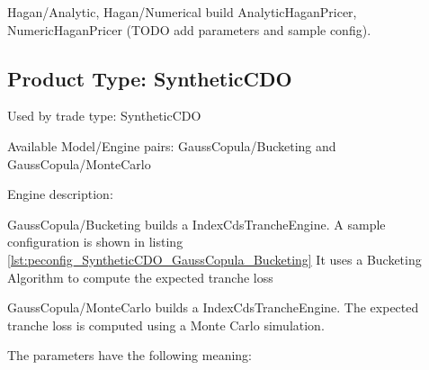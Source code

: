 Hagan/Analytic, Hagan/Numerical build AnalyticHaganPricer, NumericHaganPricer (TODO add parameters and sample config).

\subsection{Product Type: SyntheticCDO}

Used by trade type: SyntheticCDO

Available Model/Engine pairs: GaussCopula/Bucketing and GaussCopula/MonteCarlo

Engine description:

GaussCopula/Bucketing builds a IndexCdsTrancheEngine. A sample configuration is shown in listing
\ref{lst:peconfig_SyntheticCDO_GaussCopula_Bucketing} It uses a Bucketing Algorithm  to compute the expected tranche loss

GaussCopula/MonteCarlo builds a IndexCdsTrancheEngine. The expected tranche loss is computed using a Monte Carlo simulation.

The parameters have the following meaning:

